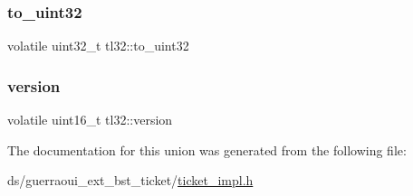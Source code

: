 \subsubsection{\texorpdfstring{to\+\_\+uint32}{to\_uint32}}
{\footnotesize\ttfamily volatile uint32\+\_\+t tl32\+::to\+\_\+uint32}

\mbox{\label{uniontl32_a6c0a2ef80fef6bb48ba2801afddf9630}} 
\subsubsection{\texorpdfstring{version}{version}}
{\footnotesize\ttfamily volatile uint16\+\_\+t tl32\+::version}



The documentation for this union was generated from the following file\+:\begin{DoxyCompactItemize}
\item 
ds/guerraoui\+\_\+ext\+\_\+bst\+\_\+ticket/\hyperlink{ticket__impl_8h}{ticket\+\_\+impl.\+h}\end{DoxyCompactItemize}
